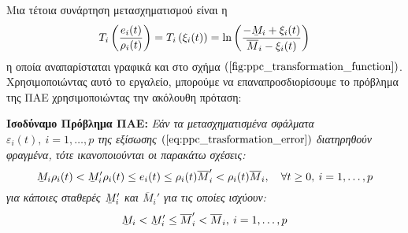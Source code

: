 Μια τέτοια συνάρτηση μετασχηματισμού είναι η
\begin{equation}
	T_i \left( \frac{e_i(t)}{\rho_i(t)} \right) = T_i \left( \xi_i(t) \right) =
	\ln \left( \frac{-\barbelow{M}_i + \xi_i(t) }{\overline{M}_i - \xi_i(t)} \right)
	\label{eq:ppc_log_transform}
\end{equation}
η οποία αναπαρίσταται γραφικά και στο σχήμα $(\ref{fig:ppc_transformation_function})$. Χρησιμοποιώντας αυτό το εργαλείο, μπορούμε να επαναπροσδιορίσουμε το πρόβλημα της ΠΑΕ χρησιμοποιώντας την ακόλουθη πρόταση:

\textbf{Ισοδύναμο Πρόβλημα ΠΑΕ:}
\textit{ Εάν τα μετασχηματισμένα σφάλματα $\varepsilon_i(t), \: i = 1,\dots ,p$ της εξίσωσης $(\ref{eq:ppc_trasformation_error})$ διατηρηθούν φραγμένα, τότε ικανοποιούνται οι παρακάτω σχέσεις:
\begin{equation*}
\barbelow{M}_i \rho_i(t) < \barbelow{M}_i' \rho_i(t) \leq e_i(t) \leq \rho_i(t) \overline{M}_i' < \rho_i(t) \overline{M}_i, \quad \forall t \geq 0, \: i = 1,\dots ,p
\end{equation*}
για κάποιες σταθερές $\barbelow{M}_i'$ και $\overline{M}_i'$ για τις οποίες ισχύουν:
\begin{equation}
\barbelow{M}_i < \barbelow{M}_i' \leq \overline{M}_i' < \overline{M}_i, \: i = 1,\dots ,p
\end{equation}
\label{eq:overshoot_bounds}
}

